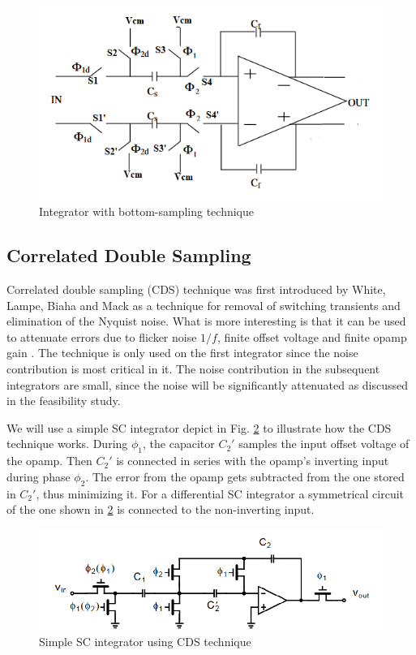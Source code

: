 \begin{figure}[ht]
\centering
\includegraphics[scale=0.7]{images/DT_integrator_delayed.png}
\caption{Integrator with bottom-sampling technique}
\label{fig:bottom_sampling}
\end{figure}

\subsection{Correlated Double Sampling}

Correlated double sampling (CDS) technique was first introduced by White, Lampe, Biaha and Mack \cite{cds} as a technique for removal of switching transients and elimination of the Nyquist noise. What is more interesting is that it can be used to attenuate errors due to flicker noise $1/f$, finite offset voltage and finite opamp gain \cite{corr}. The technique is only used on the first integrator since the noise contribution is most critical in it. The noise contribution in the subsequent integrators are small, since the noise will be significantly attenuated as discussed in the feasibility study. 

We will use a simple SC integrator depict in Fig. \ref{fig:cds} to illustrate how the CDS technique works. During $\phi_1$, the capacitor $C_2'$ samples the input offset voltage of the opamp. Then $C_2'$ is connected in series with the opamp's inverting input during phase $\phi_2$. The error from the opamp gets subtracted from the one stored in $C_2'$, thus minimizing it. For a differential SC integrator a symmetrical circuit of the one shown in \ref{fig:cds} is connected to the non-inverting input.  

\begin{figure}[ht]
\centering
\includegraphics[width=\textwidth]{images/cds.png}
\caption{Simple SC integrator using CDS technique \cite{Johns} }
\label{fig:cds}
\end{figure}

